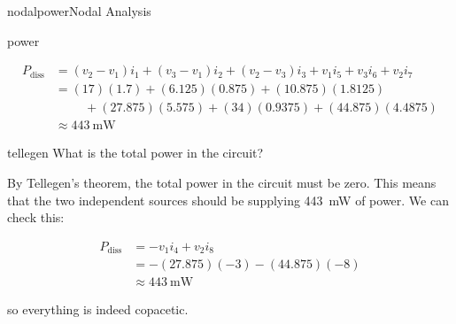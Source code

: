 \begin{mainquestion}{nodalpower}{Nodal Analysis}
\begin{partquestion}{power}
\begin{answer}
\begin{align*}
P_{\text{diss}} &= (v_2 - v_1)i_1 + (v_3 - v_1)i_2 + (v_2 - v_3)i_3 + v_1i_5 + v_3i_6 + v_2i_7 \\
&= (17)(1.7) + (6.125)(0.875) + (10.875)(1.8125) \\
&\hspace{1cm} + (27.875)(5.575) + (34)(0.9375) + (44.875)(4.4875) \\
&\approx \qty{443}{\milli\watt}
\end{align*}

\end{answer}
\end{partquestion}

\begin{partquestion}{tellegen}
{What is the total power in the circuit?}

\begin{answer}
By Tellegen’s theorem, the total power in the circuit must be zero. This means that the two independent sources should be supplying \qty{443}{\milli\watt} of power. We can check this:

\begin{align*}
P_{\text{diss}} &= -v_1i_4 + v_2i_8\\
&= -(27.875)(-3) - (44.875)(-8) \\
&\approx \qty{443}{\milli\watt}
\end{align*}

so everything is indeed copacetic.
\end{answer}
\end{partquestion}

\end{mainquestion}